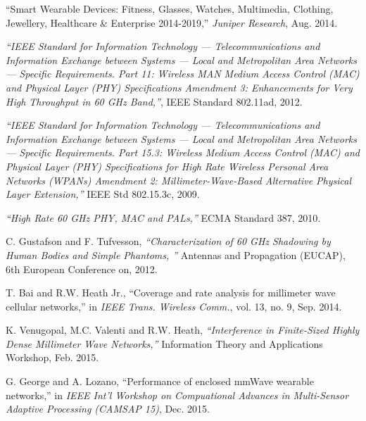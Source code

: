 \documentclass[10pt, conference, letterpaper]{IEEEtran}
\begin{document}
\begin{thebibliography}{50}
``Smart Wearable Devices: Fitness, Glasses, Watches, Multimedia, Clothing, Jewellery, Healthcare \& Enterprise 2014-2019,'' \emph{Juniper Research}, Aug. 2014.

\emph{``IEEE Standard for Information Technology — Telecommunications and Information Exchange between Systems — Local and Metropolitan Area Networks — Specific Requirements. Part 11: Wireless MAN Medium Access Control (MAC) and Physical Layer (PHY) Specifications Amendment 3: Enhancements for Very High Throughput in 60 GHz Band,''}, IEEE Standard 802.11ad, 2012.

\emph{``IEEE Standard for Information Technology — Telecommunications and Information Exchange between Systems — Local and Metropolitan Area Networks — Specific Requirements. Part 15.3: Wireless Medium Access Control (MAC) and Physical Layer (PHY) Specifications for High Rate Wireless Personal Area Networks (WPANs) Amendment 2: Millimeter-Wave-Based Alternative Physical Layer Extension,''} IEEE Std 802.15.3c, 2009.

\emph{``High Rate 60 GHz PHY, MAC and PALs,''} ECMA Standard 387, 2010.


C. Gustafson and F. Tufvesson, \emph{``Characterization of 60 GHz Shadowing by Human Bodies and Simple Phantoms, ''} Antennas and Propagation (EUCAP), 6th European Conference on, 2012.

T. Bai and R.W. Heath Jr., ``Coverage and rate analysis for millimeter wave cellular networks,'' in \emph{IEEE Trans. Wireless Comm.}, vol. 13, no. 9, Sep. 2014.

K. Venugopal, M.C. Valenti and R.W. Heath, \emph{``Interference in Finite-Sized Highly Dense Millimeter Wave Networks,''} Information Theory and Applications Workshop, Feb. 2015.

G. George and A. Lozano, ``Performance of enclosed mmWave wearable networks,'' in \emph{IEEE Int'l Workshop on Compuational Advances in Multi-Sensor Adaptive Processing (CAMSAP 15)}, Dec. 2015.


\end{thebibliography}
\end{document}
